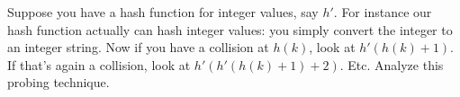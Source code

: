 Suppose you have a hash function for integer values, say $h'$.
For instance our hash function
actually can hash integer values: you simply convert the 
integer to an integer string. 
Now if you have a collision at $h(k)$, look at $h'(h(k) + 1)$.
If that's again a collision, look at $h'(h'(h(k) + 1) + 2)$.
Etc.
Analyze this probing technique.
